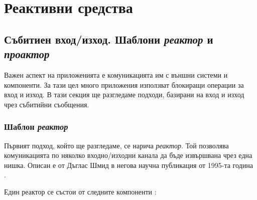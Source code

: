 \chapter{Реактивни средства}
\label{ch:reactive-tools}

\section{Събитиен вход/изход. Шаблони \emph{реактор} и \emph{проактор}}

Важен аспект на приложенията е комуникацията им с външни системи и компоненти. За тази цел много приложения използват блокиращи операции за вход и изход. В тази секция ще разгледаме подходи, базирани на вход и изход чрез събитийни съобщения.

\subsection{Шаблон \emph{реактор}}
\label{sec:reactor-pattern}

Първият подход, който ще разгледаме, се нарича \emph{реактор}. Той позволява комуникацията по няколко входно/изходни канала да бъде извършвана чрез една нишка. Описан е от Дъглас Шмид в негова научна публикация от 1995-та година \cite{schmidt1995Reactor}.

Един реактор се състои от следните компоненти \cite{schmidt1995Reactor}:

